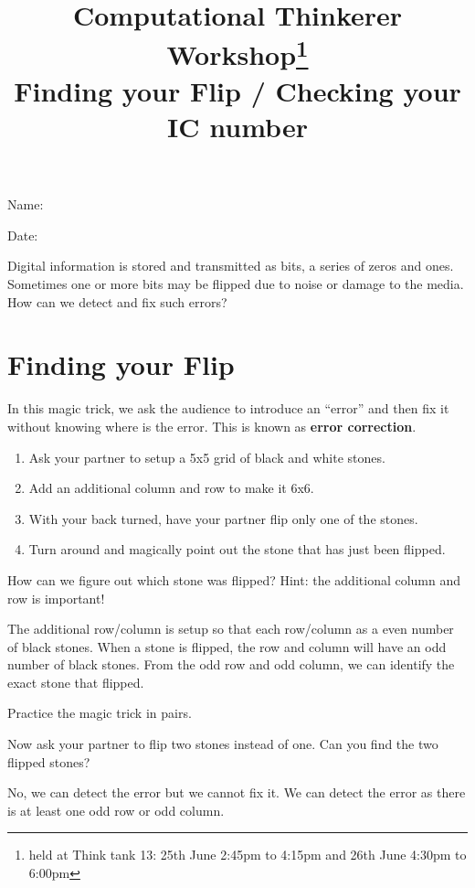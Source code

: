\documentclass[a4paper,12pt]{article}
\title{Computational Thinkerer Workshop\footnote{held at Think tank 13: 25th June 2:45pm to 4:15pm and 26th June 4:30pm to 6:00pm}\\
Finding your Flip / Checking your IC number
\vspace{-2cm}}
\date{}
\newcommand\Blank[2][.33\linewidth]{%
  \rule{0pt}{4ex}%
  #2\enspace
  \makebox[#1]{\hrulefill}}
\begin{document}
\maketitle
\begin{flushright}
  \Blank{Name:}

  \Blank{Date:}
\end{flushright}

Digital information is stored and transmitted as bits, a series of
zeros and ones. Sometimes one or more bits may be flipped due to noise or damage
to the media. How can we detect and fix such errors?

\section*{Finding your Flip}
In this magic trick, we ask the audience to introduce an ``error'' and then fix
it without knowing where is the error. This is known as \textbf{error correction}.
\begin{enumerate}
    \item Ask your partner to setup a 5x5 grid of black and white stones.
    \item Add an additional column and row to make it 6x6.
    \item With your back turned, have your partner flip only one of the stones.
    \item Turn around and magically point out the stone that has just been flipped.
\end{enumerate}

\begin{question}[skip-below=3\baselineskip]
How can we figure out which stone was flipped? Hint: the additional column and row is important!
\end{question}
\begin{solution}
The additional row/column is setup so that each row/column as a even number of black stones.
When a stone is flipped, the row and column will have an odd number of black stones.
From the odd row and odd column, we can identify the exact stone that flipped.  
\end{solution}

\begin{question}[skip-below=3\baselineskip]
Practice the magic trick in pairs.
\end{question}

\begin{question}[skip-below=3\baselineskip,name=Advance exercise]
Now ask your partner to flip two stones instead of one. Can you find the two flipped stones?
\end{question}
\begin{solution}
No, we can detect the error but we cannot fix it. We can detect the error as
there is at least one odd row or odd column.  
\end{solution}
\end{document}
